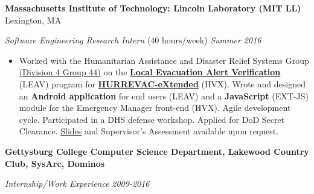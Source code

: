 \documentclass[11pt]{article}
\begin{document}
\textbf{Massachusetts Institute of Technology: Lincoln Laboratory (MIT LL)}
\hfill
Lexington, MA 

\textit{Software Engineering Research Intern} {\small (40 hours/week)}
\hfill
\textit{Summer 2016}

\begin{itemize}
	\item Worked with the Humanitarian Assistance and Disaster Relief Systems Group \href{https://www.ll.mit.edu/mission/division4.html#gp44}{(Division 4 Group 44)} on the \href{https://www.dhs.gov/publication/national-hurricane-program-technology-modernization-local-evacuation-alert-verification}{\textbf{Local Evacuation Alert Verification}} (LEAV) program for \href{https://www.dhs.gov/publication/national-hurricane-program-technology-modernization-hurrevac-extended-hv-x}{\textbf{HURREVAC-eXtended}} (HVX). Wrote and designed an \textbf{Android application} for end users (LEAV) and a \textbf{JavaScript} (EXT-JS) module for the Emergency Manager front-end (HVX). Agile development cycle. Participated in a DHS defense workshop. Applied for DoD Secret Clearance. \href{https://docs.google.com/presentation/d/1d6u7eK2fBJElrRpEn1KlkTfReKO_tHj5iCAGb6vgtmg/}{Slides} and Supervisor's Assessment available upon request.
\end{itemize}

\textbf{Gettysburg College Computer Science Department, Lakewood Country Club, SysArc, Dominos}
\hfill

\textit{Internship/Work Experience}
\hfill
\textit{2009-2016}


%
\end{document}
